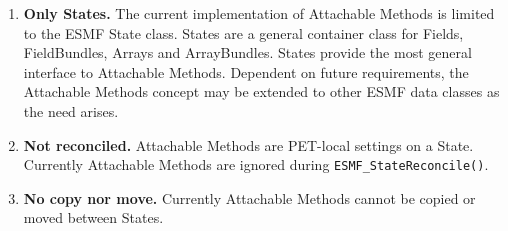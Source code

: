 %


\begin{enumerate}
\item{\bf Only States.}
The current implementation of Attachable Methods is limited to the ESMF State
class. States are a general container class for Fields, FieldBundles, Arrays
and ArrayBundles. States provide the most general interface to Attachable
Methods. Dependent on future requirements, the Attachable Methods concept may
be extended to other ESMF data classes as the need arises.
\item{\bf Not reconciled.}
Attachable Methods are PET-local settings on a State. Currently Attachable
Methods are ignored during {\tt ESMF\_StateReconcile()}.
\item{\bf No copy nor move.}
Currently Attachable Methods cannot be copied or moved between States.
\end{enumerate}




